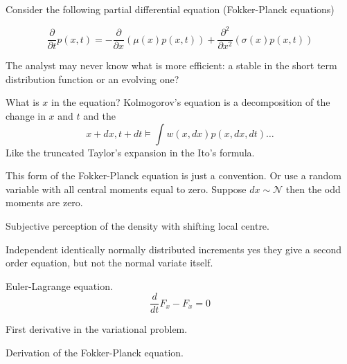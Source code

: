 \documentclass[a4paper]{article}
\newcommand{\brac}[1]{{\left ( #1 \right )}}
\begin{document}
Consider the following partial differential equation (Fokker-Planck equations)

\[\frac{\partial}{\partial t} p(x,t) = -\frac{\partial}{\partial x} \brac{ \mu(x) p(x,t) } + \frac{\partial^2}{\partial x^2} \brac{ \sigma(x) p(x,t) } \]

The analyst may never know what is more efficient: a stable in the short term distribution function or an evolving one?

What is $x$ in the equation? Kolmogorov's equation is a decomposition of the change in $x$ and $t$ and the
\[x+dx, t+dt \models \int w(x,dx) p(x, dx, dt )\ldots \]
Like the truncated Taylor's expansion in the Ito's formula.

This form of the Fokker-Planck equation is just a convention.
Or use a random variable with all central moments equal to zero.
Suppose $dx \sim \mathcal{N}$ then the odd moments are zero.


Subjective perception of the density with shifting local centre.


Independent identically normally distributed increments yes they give a second order equation, but not the normal variate itself.

Euler-Lagrange equation. \[\frac{d }{dt}F_x - F_{\dot{x}} = 0\]

First derivative in the variational problem.

Derivation of the Fokker-Planck equation.
\end{document}
